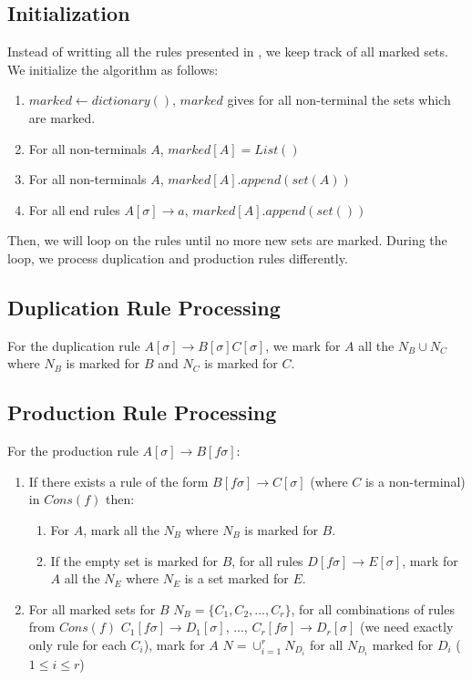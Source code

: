 \documentclass[10pt,a4paper,draft]{article}
\begin{document}
\subsection{Initialization}
\label{initAlgo}

Instead of writting all the rules presented in \cite{aho68}, we keep track of all marked sets. We initialize the algorithm as follows:

\begin{enumerate}
\item $marked \leftarrow dictionary()$, $marked$ gives for all non-terminal the sets which are marked.
\item For all non-terminals $A$, $marked[A] = List()$
\item For all non-terminals $A$, $marked[A].append(set(A))$
\item For all end rules $A[\sigma] \rightarrow a$, $marked[A].append(set())$ 
\end{enumerate}

Then, we will loop on the rules until no more new sets are marked. During the loop, we process duplication and production rules differently.

\subsection{Duplication Rule Processing}
\label{processDuplication}

For the duplication rule $A[\sigma] \rightarrow B[\sigma] C[\sigma]$, we mark for $A$ all the $N_B \cup N_C$ where $N_B$ is marked for $B$ and $N_C$ is marked for $C$.

\subsection{Production Rule Processing}
\label{processProduction}

For the production rule $A[\sigma] \rightarrow B[f \sigma]$:
\begin{enumerate}
\item If there exists a rule of the form $B[f \sigma] \rightarrow C[\sigma]$ (where $C$ is a non-terminal) in $Cons(f)$ then:
\begin{enumerate}
\item For $A$, mark all the $N_B$ where $N_B$ is marked for $B$.
\item If the empty set is marked for $B$, for all rules $D[f \sigma] \rightarrow E[\sigma]$, mark for $A$ all the $N_E$ where $N_E$ is a set marked for $E$.
\end{enumerate}
\item For all marked sets for $B$ $N_B = \{C_1, C_2, ..., C_r\}$, for all combinations of rules from $Cons(f)$ $C_1[f \sigma] \rightarrow D_1[\sigma]$, ..., $C_r[f \sigma] \rightarrow D_r[\sigma]$ (we need exactly only rule for each $C_i$), mark for $A$ $N = \cup_{i=1}^{r} N_{D_i}$ for all $N_{D_i}$ marked for $D_i$ ($1 \leq i \leq r$)
\end{enumerate}
\end{document}
